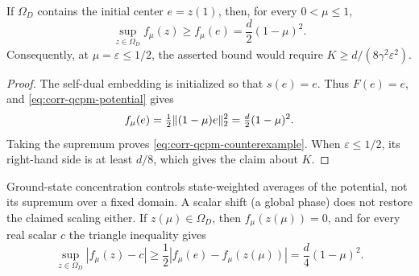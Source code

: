 \begin{proposition}
\label{prop:corr-qcpm-supremum}
If $\Omega_D$ contains the initial center $e=z(1)$, then, for every
$0<\mu\leq1$,
\begin{equation}
 \sup_{z\in\Omega_D}f_\mu(z)
 \geq f_\mu(e)=\frac d2(1-\mu)^2.                       \label{eq:corr-qcpm-counterexample}
\end{equation}
Consequently, at $\mu=\varepsilon\leq1/2$, the asserted bound would require
$K\geq d/(8\gamma^2\varepsilon^2)$.
\end{proposition}

\begin{proof}
The self-dual embedding is initialized so that $s(e)=e$.  Thus $F(e)=e$,
and \eqref{eq:corr-qcpm-potential} gives
\[
 f_\mu(e)=\tfrac12\lVert(1-\mu)e\rVert_2^2
          =\tfrac d2(1-\mu)^2.
\]
Taking the supremum proves \eqref{eq:corr-qcpm-counterexample}.  When
$\varepsilon\leq1/2$, its right-hand side is at least $d/8$, which gives the
claim about $K$.
\end{proof}

Ground-state concentration controls state-weighted averages of the
potential, not its supremum over a fixed domain.  A scalar shift (a global
phase) does not restore the claimed scaling either.  If $z(\mu)\in\Omega_D$, then $f_\mu(z(\mu))=0$, and
for every real scalar $c$ the triangle inequality gives
\[
 \sup_{z\in\Omega_D}|f_\mu(z)-c|
 \geq\frac12|f_\mu(e)-f_\mu(z(\mu))|
 =\frac d4(1-\mu)^2.
\]

